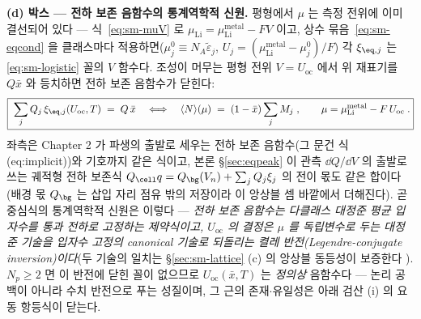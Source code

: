 \textbf{(d) 박스 --- 전하 보존 음함수의 통계역학적 신원.} 평형에서 $\mu$ 는 측정 전위에 이미 결선되어
있다 --- 식~\eqref{eq:sm-muV} 로 $\mu_\mathrm{Li}=\mu_\mathrm{Li}^\mathrm{metal}-FV$ 이고, 상수
묶음~\eqref{eq:sm-eqcond} 을 클래스마다 적용하면($\mu_j^0\equiv N_A\tilde\varepsilon_j$,
$U_j=(\mu_\mathrm{Li}^\mathrm{metal}-\mu_j^0)/F$) 각 $\xi_{\eq,j}$ 는 \eqref{eq:sm-logistic} 꼴의 $V$
함수다. 조성이 머무는 평형 전위 $V=U_{\mathrm{oc}}$ 에서 위 재표기를 $Q\bar x$ 와 등치하면 전하 보존
음함수가 닫힌다:
\begin{equation}
\boxed{\;\sum_jQ_j\,\xi_{\eq,j}(U_{\mathrm{oc}},T)\;=\;Q\,\bar x
\quad\Longleftrightarrow\quad
\langle N\rangle(\mu)\;=\;(1-\bar x)\sum_jM_j\;,\qquad
\mu=\mu_\mathrm{Li}^\mathrm{metal}-F\,U_{\mathrm{oc}}\;.}
\label{eq:sm-mc-balance}
\end{equation}
좌측은 Chapter 2 가 파생의 출발로 세우는 전하 보존 음함수(그 문건 식 (eq:implicit))와 기호까지 같은
식이고, 본론 \S\ref{sec:eqpeak} 이 관측 $\dd Q/\dd V$ 의 출발로 쓰는 궤적형 전하 보존식
$Q_\cell q=Q_\bg(V_n)+\sum_jQ_j\xi_j$ 의 전이 몫도 같은 합이다(배경 몫 $Q_\bg$ 는 삽입 자리 점유
밖의 저장이라 이 앙상블 셈 바깥에서 더해진다). 곧 중심식의 통계역학적 신원은 이렇다 --- \emph{전하
보존 음함수는 다클래스 대정준 평균 입자수를 통과 전하로 고정하는 제약식이고, $U_{\mathrm{oc}}$ 의
결정은 $\mu$ 를 독립변수로 두는 대정준 기술을 입자수 고정의 canonical 기술로 되돌리는 켤레
반전(Legendre-conjugate inversion)이다}(두 기술의 일치는 \S\ref{sec:sm-lattice} (c) 의 앙상블
동등성이 보증한다 \cite{hill1960}). $N_p\ge2$ 면 이 반전에 닫힌 꼴이 없으므로
$U_{\mathrm{oc}}(\bar x,T)$ 는 \emph{정의상} 음함수다 --- 논리 공백이 아니라 수치 반전으로 푸는
성질이며, 그 근의 존재$\cdot$유일성은 아래 검산 (i) 의 요동 항등식이 닫는다.
